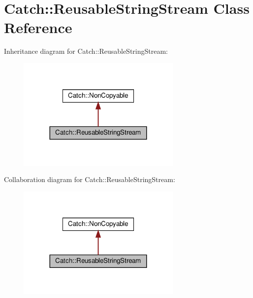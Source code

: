 \hypertarget{classCatch_1_1ReusableStringStream}{}\section{Catch\+:\+:Reusable\+String\+Stream Class Reference}
\label{classCatch_1_1ReusableStringStream}


Inheritance diagram for Catch\+:\+:Reusable\+String\+Stream\+:
\nopagebreak
\begin{figure}[H]
\begin{center}
\leavevmode
\includegraphics[width=227pt]{classCatch_1_1ReusableStringStream__inherit__graph}
\end{center}
\end{figure}


Collaboration diagram for Catch\+:\+:Reusable\+String\+Stream\+:
\nopagebreak
\begin{figure}[H]
\begin{center}
\leavevmode
\includegraphics[width=227pt]{classCatch_1_1ReusableStringStream__coll__graph}
\end{center}
\end{figure}
